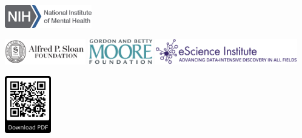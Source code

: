 \documentclass[a0paper,landscape,fontscale=0.385]{baposter}
\begin{document}
\begin{poster}
{\smaller %
\begin{minipage}[b]{0.70\textwidth}
\begin{minipage}[t]{0.31\textwidth}
    \centering
    \includegraphics[height=1.0cm]{logos/nimh-logo.png}
\end{minipage}
\hspace{1.5em} \includegraphics[height=1.1cm]{logos/SloanLogo.png}
\includegraphics[height=1.1cm]{logos/MooreFdn.png}
\hspace{6em} \includegraphics[height=1.1cm]{logos/eSciencelogo.png}
\end{minipage}
\hfill
\begin{minipage}[b]{0.13\textwidth}
    \includegraphics[height=2.5cm]{qr.png}
\end{minipage}
}



\end{poster}
\end{document}
